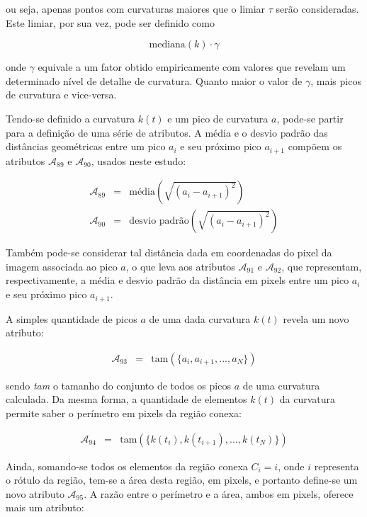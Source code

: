 \noindent ou seja, apenas pontos com curvaturas maiores que o limiar
$\tau$ serão consideradas. Este limiar, por sua vez, pode ser definido
como

\begin{equation}
	\text{mediana}\left(k\right) \cdot \gamma 
\end{equation}

\noindent onde $\gamma$ equivale a um fator obtido empiricamente com valores que
revelam um determinado nível de detalhe de curvatura. Quanto maior o valor de
$\gamma$, mais picos de curvatura e vice-versa.

Tendo-se definido a curvatura $k(t)$ e um pico de curvatura $a$, pode-se partir
para a definição de uma série de atributos. A média e o desvio padrão das
distâncias geométricas entre um pico $a_{i}$ e seu próximo pico $a_{i+1}$
compõem os atributos $\mathcal{A}_{89}$ e $\mathcal{A}_{90}$, usados neste
estudo:

\begin{eqnarray}
  \mathcal{A}_{89} & = & \text{média}(\sqrt{(a_{i} - a_{i+1})^2}) \\
  \mathcal{A}_{90} & = & \text{desvio padrão}(\sqrt{(a_{i} - a_{i+1})^2})
\end{eqnarray}

\noindent Também pode-se considerar tal distância dada em coordenadas do pixel
da imagem associada ao pico $a$, o que leva aos atributos $\mathcal{A}_{91}$ e
$\mathcal{A}_{92}$, que representam, respectivamente, a média e desvio padrão da
distância em pixels entre um pico $a_{i}$ e seu próximo pico $a_{i+1}$.

A simples quantidade de picos $a$ de uma dada curvatura $k(t)$ revela um novo
atributo:

\begin{eqnarray}
  \mathcal{A}_{93} & = & \text{tam}(\{a_{i}, a_{i+1}, ..., a_{N}\})
\end{eqnarray}

\noindent sendo \textit{tam} o tamanho do conjunto de todos os picos $a$ de uma
curvatura calculada. Da mesma forma, a quantidade de elementos $k(t)$ da
curvatura permite saber o perímetro em pixels da região conexa:

\begin{eqnarray}
  \mathcal{A}_{94} & = & \text{tam}(\{k(t_{i}), k(t_{i+1}), ..., k(t_{N})\})
\end{eqnarray}

Ainda, somando-se todos os elementos da região conexa $C_i = i$, onde $i$
representa o rótulo da região, tem-se a área desta região, em pixels, e portanto
define-se um novo atributo $\mathcal{A}_{95}$. A razão entre o perímetro e a
área, ambos em pixels, oferece mais um atributo:

